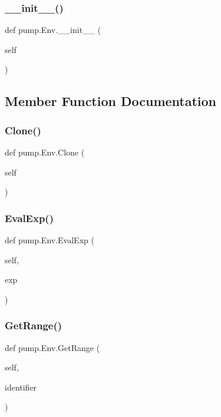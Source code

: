 \subsubsection{\texorpdfstring{\_\_init\_\_()}{\_\_init\_\_()}}
{\footnotesize\ttfamily def pump.\+Env.\+\_\+\+\_\+init\+\_\+\+\_\+ (\begin{DoxyParamCaption}\item[{}]{self }\end{DoxyParamCaption})}



\subsection{Member Function Documentation}
\mbox{\label{classpump_1_1Env_a4c1b156cfa4aec708746bbe07dae5f1a}} 
\subsubsection{\texorpdfstring{Clone()}{Clone()}}
{\footnotesize\ttfamily def pump.\+Env.\+Clone (\begin{DoxyParamCaption}\item[{}]{self }\end{DoxyParamCaption})}

\mbox{\label{classpump_1_1Env_a29fa1ceb1f7c22e8e982133f4808317f}} 
\subsubsection{\texorpdfstring{EvalExp()}{EvalExp()}}
{\footnotesize\ttfamily def pump.\+Env.\+Eval\+Exp (\begin{DoxyParamCaption}\item[{}]{self,  }\item[{}]{exp }\end{DoxyParamCaption})}

\mbox{\label{classpump_1_1Env_a1df05a550bdcfe4bb8c5b1608484a6dc}} 
\subsubsection{\texorpdfstring{GetRange()}{GetRange()}}
{\footnotesize\ttfamily def pump.\+Env.\+Get\+Range (\begin{DoxyParamCaption}\item[{}]{self,  }\item[{}]{identifier }\end{DoxyParamCaption})}


